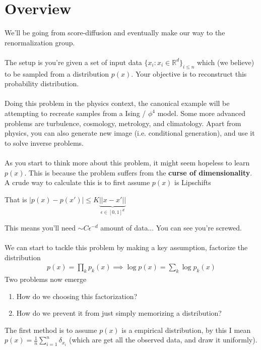 \section{Overview}
We'll be going from score-diffusion and eventually make our way to the renormalization group.\\
\\
The setup is you're given a set of input data $\{x_i : x_i \in \mathbb R^d\}_{i \leq n}$ which (we believe) to be sampled from a distribution $p(x)$. Your objective is to reconstruct this probability distribution.\\
\\
Doing this problem in the physics context, the canonical example will be attempting to recreate samples from a Ising / $\phi^4$ model. Some more advanced problems are turbulence, cosmology, metrology, and climatology. Apart from physics, you can also generate new image (i.e. conditional generation), and use it to solve inverse problems.\\
\\
As you start to think more about this problem, it might seem hopeless to learn $p(x)$. This is because the problem suffers from the \textbf{curse of dimensionality}. A crude way to calculate this is to first assume $p(x)$ is Lipschifts
\begin{definition}
	[Lipschifts] That is $| p(x) - p(x') | \leq K \underbrace{|| x- x' ||}_{\epsilon \in [0,1]^d}$
\end{definition}
This means you'll need $\sim C \epsilon^{-d}$ amount of data... You can see you're screwed.\\
\\
We can start to tackle this problem by making a key assumption, factorize the distribution
\begin{align}
	p(x) = \prod_k p_k(x) \implies \log p(x) = \sum_k \log p_k(x)
\end{align}
Two problems now emerge
\begin{enumerate}
	\item How do we choosing this factorization?
	\item How do we prevent it from just simply memorizing a distribution?
\end{enumerate} 
The first method is to assume $p(x)$ is a empirical distribution, by this I mean $p(x) = \frac{1}{n} \sum_{i=1}^n  \delta_{x_i}$ (which are get all the observed data, and draw it uniformly).


